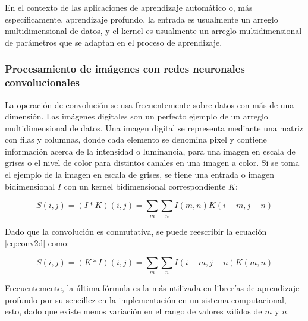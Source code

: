         En el contexto de las aplicaciones de aprendizaje automático o, más específicamente, aprendizaje profundo,
        la entrada es usualmente un arreglo multidimensional de datos, y el kernel es usualmente un arreglo 
        multidimensional de parámetros que se adaptan en el proceso de aprendizaje. 

        \subsubsection{Procesamiento de imágenes con redes neuronales convolucionales}
        La operación de convolución se usa frecuentemente sobre datos con más de una dimensión. Las imágenes digitales 
        son un perfecto ejemplo de un arreglo multidimensional de datos. Una imagen digital se representa mediante una
        matriz con filas y columnas, donde cada elemento se denomina pixel y contiene información acerca de la intensidad
        o luminancia, para una imagen en escala de grises o el nivel de color para distintos canales en una imagen a color.
        Si se toma el ejemplo de la imagen en escala de grises, se tiene una entrada o imagen bidimensional $I$ con un
        kernel bidimensional correspondiente $K$:

        \begin{equation} \label{eq:conv2d}
            S(i,j)=(I\ast K)(i,j) = \sum_{m} \sum_{n} I(m,n)K(i-m,j-n)
        \end{equation}

        Dado que la convolución es conmutativa, se puede reescribir la ecuación \ref{eq:conv2d} como:

        \begin{equation}
            S(i,j)=(K\ast I)(i,j) = \sum_{m} \sum_{n} I(i-m,j-n)K(m,n)
        \end{equation}

        Frecuentemente, la última fórmula es la más utilizada en librerías de aprendizaje profundo 
        por su sencillez en la implementación en un sistema computacional, esto, dado que existe menos 
        variación en el rango de valores válidos de $m$ y $n$.

        

